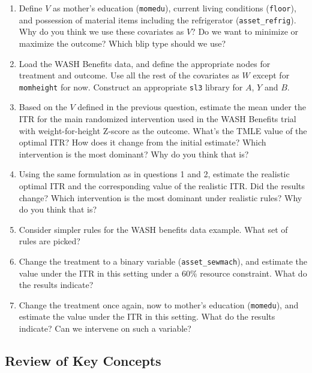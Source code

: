 \documentclass[12pt, krantz2,]{book}
\theoremstyle{definition}
\theoremstyle{definition}
\theoremstyle{definition}
\newcommand{\1}{\mathbbm{1}}
\begin{document}
\begin{enumerate}
\def\labelenumi{\arabic{enumi}.}
\item
  Define \(V\) as mother's education (\texttt{momedu}), current living conditions (\texttt{floor}),
  and possession of material items including the refrigerator (\texttt{asset\_refrig}).
  Why do you think we use these covariates as \(V\)? Do we want to minimize or
  maximize the outcome? Which blip type should we use?
\item
  Load the WASH Benefits data, and define the appropriate nodes for treatment
  and outcome. Use all the rest of the covariates as \(W\) except for
  \texttt{momheight} for now. Construct an appropriate \texttt{sl3} library for \(A\), \(Y\) and
  \(B\).
\item
  Based on the \(V\) defined in the previous question, estimate the mean under
  the ITR for the main randomized intervention used in the WASH Benefits trial
  with weight-for-height Z-score as the outcome. What's the TMLE value of the
  optimal ITR? How does it change from the initial estimate? Which
  intervention is the most dominant? Why do you think that is?
\item
  Using the same formulation as in questions 1 and 2, estimate the realistic
  optimal ITR and the corresponding value of the realistic ITR. Did the results
  change? Which intervention is the most dominant under realistic rules? Why do
  you think that is?
\item
  Consider simpler rules for the WASH benefits data example. What set of rules
  are picked?
\item
  Change the treatment to a binary variable (\texttt{asset\_sewmach}), and estimate the
  value under the ITR in this setting under a \(60\%\) resource constraint. What
  do the results indicate?
\item
  Change the treatment once again, now to mother's education (\texttt{momedu}), and
  estimate the value under the ITR in this setting. What do the results
  indicate? Can we intervene on such a variable?
\end{enumerate}

\hypertarget{review-of-key-concepts-1}{%
\subsection{Review of Key Concepts}\label{review-of-key-concepts-1}}
\end{document}
